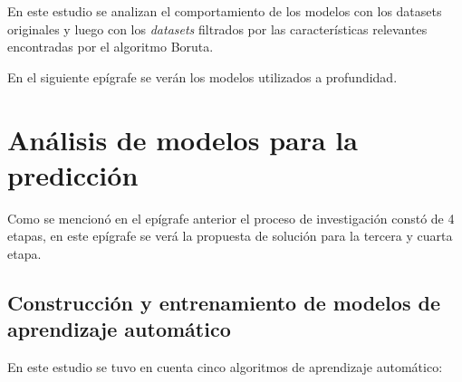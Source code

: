 En este estudio se analizan el comportamiento de los modelos con los datasets originales y luego con los \textit{datasets} filtrados por las características relevantes encontradas por el algoritmo Boruta.

En el siguiente epígrafe se verán los modelos utilizados a profundidad.

\section{Análisis de modelos para la predicción}

Como se mencionó en el epígrafe anterior el proceso de investigación constó de 4 etapas, en este epígrafe se verá la propuesta de solución para la tercera y cuarta etapa.

\subsection{Construcción y entrenamiento de modelos de aprendizaje automático}

En este estudio se tuvo en cuenta cinco algoritmos de aprendizaje automático:

